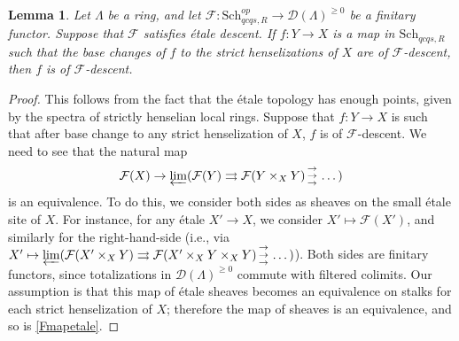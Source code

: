 \documentclass[reqno]{amsart}
\newcommand{\triplearrows}{\begin{smallmatrix} \to \\ \to \\ 
\to \end{smallmatrix} }
\newcommand{\D}{\mathcal{D}}
\newtheorem{lemma}[theorem]{Lemma}
\theoremstyle{definition}
\begin{document}
\begin{lemma} 
\label{hensdetect}
Let $\Lambda$ be a ring, and let $\mathcal{F}\colon  \mathrm{Sch}_{qcqs,R}^{op}\to \D( \Lambda)^{\geq 0}$ be a finitary functor. Suppose
that $\mathcal{F}$ satisfies \'etale descent. 
If $f\colon  Y \to X$ is a map in $\mathrm{Sch}_{qcqs,R}$ such that the base changes of $f$ to the
strict henselizations of $X$ are of $\mathcal{F}$-descent, then $f$ is of $\mathcal{F}$-descent. 
\end{lemma} 
\begin{proof} 
This follows from the fact that the \'etale topology has enough points,
given by the spectra of strictly henselian local rings. 
Suppose that $f\colon  Y \to X $ is such that after base change to any strict
henselization of $X$, $f$ is of $\mathcal{F}$-descent. 
We need to see that the natural map 
\begin{equation}  \mathcal{F}(X) \to \varprojlim( \mathcal{F}( Y) \rightrightarrows \mathcal{F}(
 Y \times_X Y)  \triplearrows \dots ) \label{Fmapetale} \end{equation}
is an equivalence. 
To do this, we consider both sides as sheaves on the small \'etale site of $X$. For
instance, for 
any \'etale $X' \to X$, we consider $X' \mapsto \mathcal{F}( X' )$, and
similarly for the right-hand-side (i.e., via $X' \mapsto \varprojlim(
\mathcal{F}(X' \times_X Y) \rightrightarrows \mathcal{F}(X' \times_X Y \times_X
Y)  \triplearrows \dots )$). 
Both sides are finitary functors, since totalizations in $\D( \Lambda)^{\geq 0}$
commute with filtered colimits. 
Our assumption is that this map of
\'etale sheaves
becomes an equivalence on stalks for each  strict henselization of $X$;
therefore the map of sheaves is an equivalence, and so is \eqref{Fmapetale}.
\end{proof} 
\end{document}
